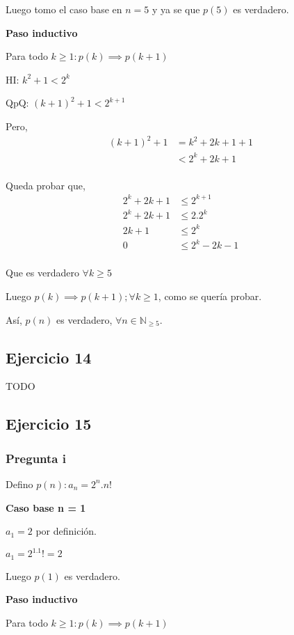 Luego tomo el caso base en $ n = 5 $ y ya se que $p(5)$ es verdadero.

\textbf{Paso inductivo}

Para todo $k \geq 1: p(k) \implies p(k+1)$

HI: $k^2 +1 < 2^k$

QpQ: $ (k+1)^2 +1 < 2^{k+1}$

Pero,
\begin{align*}
    (k+1)^2 +1 &= k^2 + 2k + 1 + 1 \\
    &< 2^k + 2k + 1 \\
\end{align*}

Queda probar que,
\begin{align*}
    2^k + 2k + 1 &\leq 2^{k+1} \\
    2^k + 2k + 1 &\leq 2.2^k \\
    2k + 1 &\leq 2^k\\
    0 &\leq 2^k  - 2k - 1\\
\end{align*}

Que es verdadero $\forall k \geq 5$

Luego $p(k) \implies p(k+1); \forall k \geq 1$, como se quería probar.

Así, $p(n)$ es verdadero, $\forall n \in \mathbb{N}_{\geq 5}$.

\subsection{Ejercicio 14}

TODO

\subsection{Ejercicio 15}

\subsubsection{Pregunta i}

Defino $ p(n): a_n = 2^n.n! $

\textbf{Caso base n = 1}

$ a_1 = 2 $ por definición. 

$ a_1 = 2^1.1! = 2 $

Luego $ p(1) $ es verdadero.

\textbf{Paso inductivo}

Para todo $k \geq 1: p(k) \implies p(k+1)$

